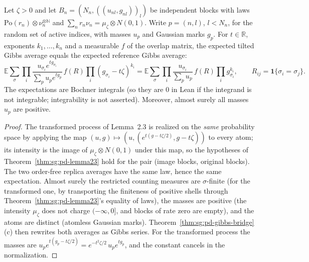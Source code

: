 \begin{theorem}\label{thm:sg:pd-gibbs}
  \leanok
{}
Let $\zeta>0$ and let $B_n=(N_n,((u_{nl},g_{nl}))_l)$ be independent blocks with laws $\mathrm{Po}(r_n)\otimes\nu_n^{\otimes\mathbb N}$ and $\sum_nr_n\nu_n=\mu_\zeta\otimes N(0,1)$. Write $p=(n,l)$, $l<N_n$, for the random set of active indices, with masses $u_p$ and Gaussian marks $g_p$. For $t\in\mathbb R$, exponents $k_1,\dots,k_n$ and a measurable $f$ of the overlap matrix, the expected tilted Gibbs average equals the expected reference Gibbs average:
\[\mathbb E\sum_{\sigma}\prod_i\frac{u_{\sigma_i}e^{tg_{\sigma_i}}}{\sum_pu_pe^{tg_p}}\,f(R)\prod_i(g_{\sigma_i}-t\zeta)^{k_i}=\mathbb E\sum_{\sigma}\prod_i\frac{u_{\sigma_i}}{\sum_pu_p}\,f(R)\prod_ig_{\sigma_i}^{k_i},\qquad R_{ij}=\mathbf 1\{\sigma_i=\sigma_j\}.\]
The expectations are Bochner integrals (so they are $0$ in Lean if the integrand is not integrable; integrability is not asserted). Moreover, almost surely all masses $u_p$ are positive.
\end{theorem}

\begin{proof}
  \leanok
The transformed process of Lemma~2.3 is realized on the \emph{same} probability space by applying the map $(u,g)\mapsto(u,(e^{t(g-t\zeta/2)},g-t\zeta))$ to every atom; its intensity is the image of $\mu_\zeta\otimes N(0,1)$ under this map, so the hypotheses of Theorem~\ref{thm:sg:pd-lemma23} hold for the pair (image blocks, original blocks). The two order-free replica averages have the same law, hence the same expectation. Almost surely the restricted counting measures are $\sigma$-finite (for the transformed one, by transporting the finiteness of positive shells through Theorem~\ref{thm:sg:pd-lemma23}'s equality of laws), the masses are positive (the intensity $\mu_\zeta$ does not charge $(-\infty,0]$, and blocks of rate zero are empty), and the atoms are distinct (atomless Gaussian marks). Theorem~\ref{thm:sg:pd-gibbs-bridge}(c) then rewrites both averages as Gibbs series. For the transformed process the masses are $u_pe^{t(g_p-t\zeta/2)}=e^{-t^2\zeta/2}\,u_pe^{tg_p}$, and the constant cancels in the normalization.
\end{proof}

